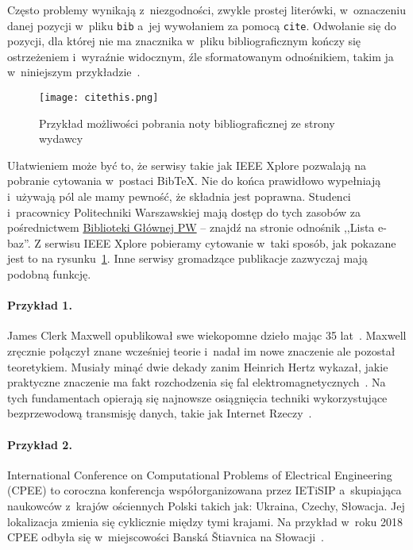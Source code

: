 Często problemy wynikają z~niezgodności, zwykle prostej literówki, w~oznaczeniu danej pozycji w~pliku \texttt{bib} a~jej wywołaniem za pomocą \texttt{cite}. Odwołanie się do pozycji, dla której nie ma znacznika w~pliku bibliograficznym kończy się ostrzeżeniem i~wyraźnie widocznym, źle sformatowanym odnośnikiem, takim ja w~niniejszym przykładzie~\cite{tegoniema}.

\begin{figure}[t]
    \centering \texttt{[image: citethis.png]} %
    \caption{Przykład możliwości pobrania noty bibliograficznej ze strony wydawcy}
    \label{rys:citethis}
\end{figure}

Ułatwieniem może być to, że serwisy takie jak IEEE Xplore pozwalają na pobranie cytowania w~postaci BibTeX. Nie do końca prawidłowo wypełniają i~używają pól ale mamy pewność, że składnia jest poprawna. Studenci i~pracownicy Politechniki Warszawskiej mają dostęp do tych zasobów za pośrednictwem \href{https://bg.pw.edu.pl/}{Biblioteki Głównej PW} -- znajdź na stronie odnośnik ,,Lista e-baz''. Z serwisu IEEE Xplore pobieramy cytowanie w~taki sposób, jak pokazane jest to na rysunku~\ref{rys:citethis}. Inne serwisy gromadzące publikacje zazwyczaj mają podobną funkcję.

\paragraph{Przykład 1.}
James Clerk Maxwell opublikował swe wiekopomne dzieło mając 35 lat~\cite{maxwell1865}. Maxwell zręcznie połączył znane wcześniej teorie i~nadał im nowe znaczenie ale pozostał teoretykiem. Musiały minąć dwie dekady zanim Heinrich Hertz wykazał, jakie praktyczne znaczenie ma fakt rozchodzenia się fal elektromagnetycznych~\cite{cichon1995}. Na tych fundamentach opierają się najnowsze osiągnięcia techniki wykorzystujące bezprzewodową transmisję danych, takie jak Internet Rzeczy~\cite{lncsevo}.

\paragraph{Przykład 2.} International Conference on Computational Problems of Electrical Engineering (CPEE) to coroczna konferencja współorganizowana przez IETiSIP a~skupiająca naukowców z~krajów ościennych Polski takich jak: Ukraina, Czechy, Słowacja. Jej lokalizacja zmienia się cyklicznie między tymi krajami. Na przykład w~roku 2018 CPEE odbyła się w~miejscowości Banská Štiavnica na Słowacji~\cite{cpee2018}.

